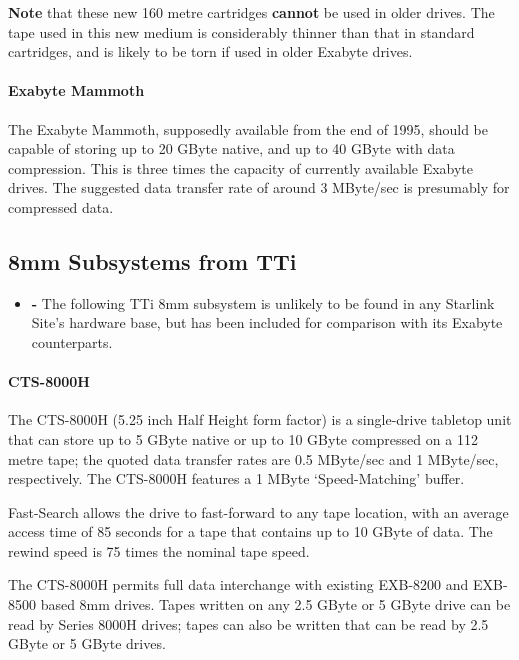 \documentclass[11pt]{article}
\begin{document}
{\bf Note} that these new 160 metre cartridges {\bf cannot} be used in older
drives. The tape used in this new medium is considerably thinner than that
in standard cartridges, and is likely to be torn if used in older Exabyte
drives.

\paragraph {Exabyte Mammoth}

The Exabyte Mammoth, supposedly available from the end of 1995, should be
capable of storing up to 20 GByte native, and up to 40 GByte with data
compression. This is three times the capacity of currently available Exabyte
drives. The suggested data transfer rate of around 3 MByte/sec is presumably
for compressed data.

\subsection {8mm Subsystems from TTi}

\begin {itemize}

\item[{\huge\bf -}] The following TTi 8mm subsystem is unlikely to be found in
any Starlink Site's hardware base, but has been included for comparison with its
Exabyte counterparts.

\end {itemize}

\paragraph {CTS-8000H}

The CTS-8000H (5.25 inch Half Height form factor) is a single-drive tabletop
unit that can store up to 5 GByte native or up to 10 GByte compressed on a
112 metre tape; the quoted data transfer rates are 0.5 MByte/sec and 1
MByte/sec, respectively. The CTS-8000H features a 1 MByte `Speed-Matching'
buffer.

Fast-Search allows the drive to fast-forward to any tape location, with an
average access time of 85 seconds for a tape that contains up to 10 GByte of
data. The rewind speed is 75 times the nominal tape speed.

The CTS-8000H permits full data interchange with existing EXB-8200 and
EXB-8500 based 8mm drives. Tapes written on any 2.5 GByte or 5 GByte drive
can be read by Series 8000H drives; tapes can also be written that can be
read by 2.5 GByte or 5 GByte drives.
\end{document}
